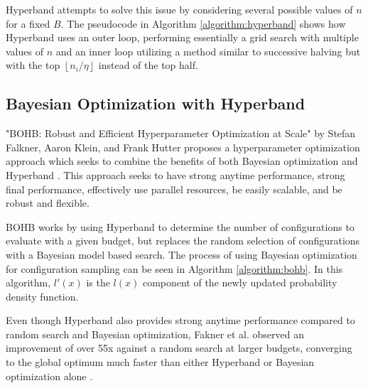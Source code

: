 Hyperband attempts to solve this issue by considering several possible values of $n$ for a fixed $B$.
The pseudocode in Algorithm \ref{algorithm:hyperband} shows how Hyperband uses an outer loop, performing essentially a grid search with multiple values of $n$ and an inner loop utilizing a method similar to successive halving but with the top $\left\lfloor n_i/\eta\right\rfloor$ instead of the top half.



\subsection{Bayesian Optimization with Hyperband}\label{section:background-bohb}
"BOHB: Robust and Efficient Hyperparameter Optimization at Scale" by Stefan Falkner, Aaron Klein, and Frank Hutter proposes a hyperparameter optimization approach which seeks to combine the benefits of both Bayesian optimization and Hyperband \cite{bohb}.
This approach seeks to have strong anytime performance, strong final performance, effectively use parallel resources, be easily scalable, and be robust and flexible.

BOHB works by using Hyperband to determine the number of configurations to evaluate with a given budget, but replaces the random selection of configurations with a Bayesian model based search.
The process of using Bayesian optimization for configuration sampling can be seen in Algorithm \ref{algorithm:bohb}. In this algorithm, $l'(x)$ is the $l(x)$ component of the newly updated probability density function.

Even though Hyperband also provides strong anytime performance compared to random search and Bayesian optimization, Fakner et al. observed an improvement of over 55x against a random search at larger budgets, converging to the global optimum much faster than either Hyperband or Bayesian optimization alone \cite{bohb}.

